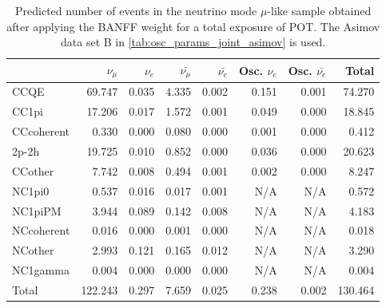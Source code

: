 
\begin{table}
\center
\begin{tabular} { | l ||r | r | r | r | r | r | | r | }
\hline
              & $\nu_\mu$            & $\nu_e$              & $\bar{\nu_\mu}$      & $\bar{\nu_e}$        & Osc. $\nu_e$         & Osc. $\bar{\nu_e}$   & Total                \\ \hline\hline
 CCQE         & 69.747               & 0.035                & 4.335                & 0.002                & 0.151                & 0.001                & 74.270               \\ \hline
 CC1pi        & 17.206               & 0.017                & 1.572                & 0.001                & 0.049                & 0.000                & 18.845               \\ \hline
 CCcoherent   & 0.330                & 0.000                & 0.080                & 0.000                & 0.001                & 0.000                & 0.412                \\ \hline
 2p-2h          & 19.725               & 0.010                & 0.852                & 0.000                & 0.036                & 0.000                & 20.623               \\ \hline
 CCother      & 7.742                & 0.008                & 0.494                & 0.001                & 0.002                & 0.000                & 8.247                \\ \hline
 NC1pi0       & 0.537                & 0.016                & 0.017                & 0.001                & N/A                  & N/A                  & 0.572                \\ \hline
 NC1piPM      & 3.944                & 0.089                & 0.142                & 0.008                & N/A                  & N/A                  & 4.183                \\ \hline
 NCcoherent   & 0.016                & 0.000                & 0.001                & 0.000                & N/A                  & N/A                  & 0.018                \\ \hline
 NCother      & 2.993                & 0.121                & 0.165                & 0.012                & N/A                  & N/A                  & 3.290                \\ \hline
 NC1gamma     & 0.004                & 0.000                & 0.000                & 0.000                & N/A                  & N/A                  & 0.004                \\ \hline
\hline
 Total        & 122.243              & 0.297                & 7.659                & 0.025                & 0.238                & 0.002                & 130.464              \\ \hline
\end{tabular}
\caption{
Predicted number of events in the neutrino mode $\mu$-like sample
obtained after applying the BANFF weight
for a total exposure of \TotalPotNu{} POT.
The Asimov data set B in \cref{tab:osc_params_joint_asimov} is used.
}
\label{tab:events_1rmu_Asimov_B}
\end{table}


